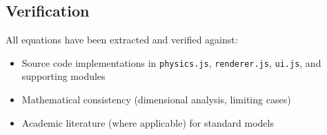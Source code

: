 \subsection{Verification}

All equations have been extracted and verified against:
\begin{itemize}
  \item Source code implementations in \texttt{physics.js}, \texttt{renderer.js}, \texttt{ui.js}, and supporting modules
  \item Mathematical consistency (dimensional analysis, limiting cases)
  \item Academic literature (where applicable) for standard models
\end{itemize}

\newpage
